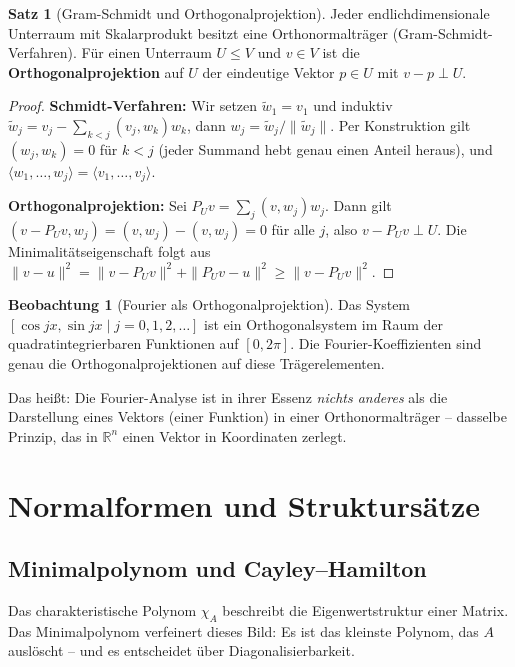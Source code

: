 ﻿\documentclass[a4paper,12pt]{report}
\theoremstyle{definition}
\newtheorem{satz}{Satz}
\newtheorem{beobachtung}{Beobachtung}
\begin{document}
\begin{satz}[Gram-Schmidt und Orthogonalprojektion]
    Jeder endlichdimensionale Unterraum mit Skalarprodukt besitzt eine
    Orthonormalträger (Gram-Schmidt-Verfahren). Für einen Unterraum $U \le V$
    und $v \in V$ ist die \textbf{Orthogonalprojektion} auf $U$ der eindeutige
    Vektor $p \in U$ mit $v - p \perp U$.
\end{satz}
\begin{proof}
    \textbf{Schmidt-Verfahren:} Wir setzen $\tilde{w}_1 = v_1$ und induktiv
    $\tilde{w}_j = v_j - \sum_{k<j} (v_j, w_k) w_k$, dann $w_j = \tilde{w}_j / \|\tilde{w}_j\|$.
    Per Konstruktion gilt $(w_j, w_k) = 0$ für $k < j$ (jeder Summand hebt genau
    einen Anteil heraus), und $\langle w_1, \ldots, w_j \rangle = \langle v_1, \ldots, v_j \rangle$.

    \textbf{Orthogonalprojektion:} Sei $P_U v = \sum_j (v, w_j) w_j$.
    Dann gilt $(v - P_U v, w_j) = (v, w_j) - (v, w_j) = 0$ für alle $j$,
    also $v - P_U v \perp U$. Die Minimalitätseigenschaft folgt aus
    $\|v - u\|^2 = \|v - P_U v\|^2 + \|P_U v - u\|^2 \geq \|v - P_U v\|^2$.
\end{proof}


\begin{beobachtung}[Fourier als Orthogonalprojektion]
    Das System $[\cos jx, \sin jx \mid j = 0, 1, 2, \dots]$ ist ein
    Orthogonalsystem im Raum der quadratintegrierbaren Funktionen auf
    $[0, 2\pi]$. Die Fourier-Koeffizienten sind genau die
    Orthogonalprojektionen auf diese Trägerelementen.

    Das heißt: Die Fourier-Analyse ist in ihrer Essenz \emph{nichts anderes}
    als die Darstellung eines Vektors (einer Funktion) in einer
    Orthonormalträger -- dasselbe Prinzip, das in $\mathbb{R}^n$ einen
    Vektor in Koordinaten zerlegt.
\end{beobachtung}

\chapter{Normalformen und Struktursätze}

\section{Minimalpolynom und Cayley--Hamilton}

Das charakteristische Polynom $\chi_A$ beschreibt die Eigenwertstruktur
einer Matrix. Das Minimalpolynom verfeinert dieses Bild: Es ist das
kleinste Polynom, das $A$ auslöscht -- und es entscheidet über
Diagonalisierbarkeit.
\end{document}
